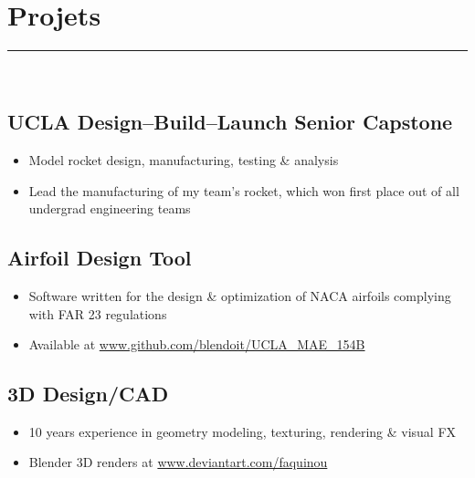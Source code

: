 \documentclass[10pt]{report}
\begin{document}
\section*{Projets}
\rule{\linewidth}{1pt}\\
\subsection*{UCLA Design--Build--Launch Senior Capstone}
\begin{itemize}
    \item Model rocket design, manufacturing, testing \& analysis
    \item Lead the manufacturing of my team's rocket, which won first place out of all undergrad engineering teams
\end{itemize}
\subsection*{Airfoil Design Tool}
\begin{itemize}
    \item Software written for the design \& optimization of NACA airfoils complying with FAR 23 regulations
    \item  Available at \url{www.github.com/blendoit/UCLA_MAE_154B}
\end{itemize}
\subsection*{3D Design/CAD}
\begin{itemize}
    \item 10 years experience in geometry modeling, texturing, rendering \& visual FX
    \item Blender 3D renders at \url{www.deviantart.com/faquinou}
\end{itemize}
\end{document}
